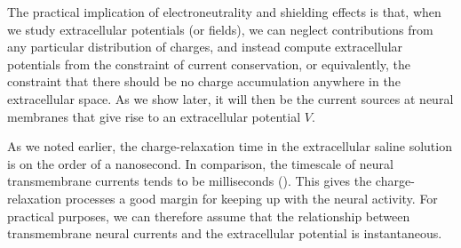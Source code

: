 The practical implication of electroneutrality and shielding effects is that, when we study extracellular potentials (or fields), we can neglect contributions from any particular distribution of charges, and instead compute extracellular potentials from the constraint of current conservation, or equivalently, the constraint that  there should be no charge accumulation anywhere in the extracellular space. As we show later, it will then be the current sources at neural membranes that give rise to an extracellular potential $V$. 


As we noted earlier, the charge-relaxation time in the extracellular saline solution is on the order of a nanosecond. In comparison, the timescale of neural transmembrane currents tends to be milliseconds (). This gives the charge-relaxation processes a good margin for keeping up with the neural activity. For practical purposes, we can therefore assume that the relationship between transmembrane neural currents and the extracellular potential is instantaneous.


